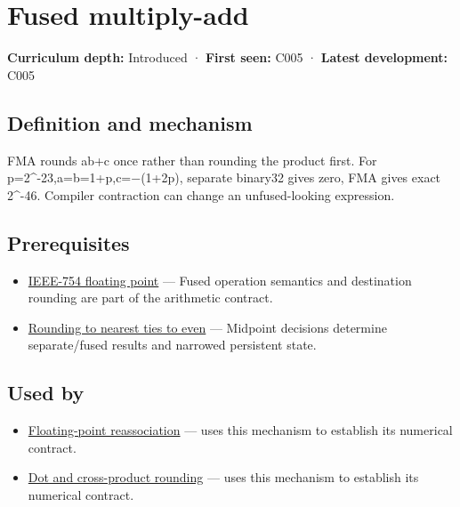 \hypertarget{appendix-41e8ef22a21e}{}\label{referencestart:appendix-41e8ef22a21e}
\section{Fused multiply-add}\label{appendix-41e8ef22a21e-fused-multiply-add}

\textbf{Curriculum depth:} Introduced · \textbf{First seen:} C005 · \textbf{Latest development:} C005

\subsection{Definition and mechanism}\label{appendix-41e8ef22a21e-definition-and-mechanism}

FMA rounds ab+c once rather than rounding the product first. For p=2\^{}-23,a=b=1+p,c=−(1+2p), separate binary32 gives zero, FMA gives exact 2\^{}-46. Compiler contraction can change an unfused-looking expression.

\subsection{Prerequisites}\label{appendix-41e8ef22a21e-prerequisites}

\begin{itemize}
\tightlist
\item
  \hyperref[appendix-343615f49ddf]{IEEE-754 floating point} --- Fused operation semantics and destination rounding are part of the arithmetic contract.
\item
  \hyperref[appendix-614afe1de592]{Rounding to nearest ties to even} --- Midpoint decisions determine separate/fused results and narrowed persistent state.
\end{itemize}

\subsection{Used by}\label{appendix-41e8ef22a21e-used-by}

\begin{itemize}
\tightlist
\item
  \hyperref[appendix-c2ac4a84c283]{Floating-point reassociation} --- uses this mechanism to establish its numerical contract.
\item
  \hyperref[appendix-5aef4f13483a]{Dot and cross-product rounding} --- uses this mechanism to establish its numerical contract.
\end{itemize}

